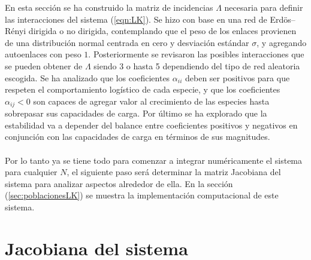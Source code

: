 En esta sección se ha construido la matriz de incidencias $\Lambda$ necesaria para definir las interacciones del sistema (\ref{eqn:LK}). Se hizo con base en una red de Erdös–Rényi dirigida o no dirigida, contemplando que el peso de los enlaces provienen de una distribución normal centrada en cero y desviación estándar $\sigma$, y agregando autoenlaces con peso $1$. Posteriormente se revisaron las posibles interacciones que se pueden obtener de $\Lambda$ siendo 3 o hasta 5 dependiendo del tipo de red aleatoria escogida. Se ha analizado que los coeficientes $\alpha_{ii}$ deben ser positivos para que respeten el comportamiento logístico de cada especie, y que los coeficientes $\alpha_{ij}<0$ son capaces de agregar valor al crecimiento de las especies hasta sobrepasar sus capacidades de carga. Por último se ha explorado que la estabilidad va a depender del balance entre coeficientes positivos y negativos en conjunción con las capacidades de carga en términos de sus magnitudes.
\\
\\
Por lo tanto ya se tiene todo para comenzar a integrar numéricamente el sistema para cualquier $N$, el siguiente paso será determinar la matriz Jacobiana del sistema para analizar aspectos alrededor de ella. En la sección (\ref{sec:poblacionesLK}) se muestra la implementación computacional de este sistema.

\section{Jacobiana del sistema}

